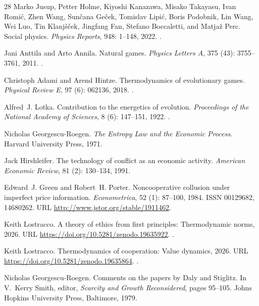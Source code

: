\documentclass[11pt]{article}
\theoremstyle{plain}
\theoremstyle{definition}
\theoremstyle{remark}
\begin{document}
\begin{thebibliography}{28}
Marko Jusup, Petter Holme, Kiyoshi Kanazawa, Misako Takayasu, Ivan Romi{\'c},
  Zhen Wang, Sun{\v c}ana Ge{\v c}ek, Tomislav Lipi{\'c}, Boris Podobnik, Lin
  Wang, Wei Luo, Tin Klanj{\v s}{\v c}ek, Jingfang Fan, Stefano Boccaletti, and
  Matja{\v z} Perc.
\newblock Social physics.
\newblock \emph{Physics Reports}, 948: 1--148, 2022.
\newblock {}.

Jani Anttila and Arto Annila.
\newblock Natural games.
\newblock \emph{Physics Letters A}, 375 (43): 3755--3761,
  2011.
\newblock {}.

Christoph Adami and Arend Hintze.
\newblock Thermodynamics of evolutionary games.
\newblock \emph{Physical Review E}, 97 (6): 062136, 2018.
\newblock {}.

Alfred~J. Lotka.
\newblock Contribution to the energetics of evolution.
\newblock \emph{Proceedings of the National Academy of Sciences}, 8
  (6): 147--151, 1922.
\newblock {}.

Nicholas Georgescu-Roegen.
\newblock \emph{The Entropy Law and the Economic Process}.
\newblock Harvard University Press, 1971.

Jack Hirshleifer.
\newblock The technology of conflict as an economic activity.
\newblock \emph{American Economic Review}, 81 (2): 130--134,
  1991.

Edward~J. Green and Robert~H. Porter.
\newblock Noncooperative collusion under imperfect price information.
\newblock \emph{Econometrica}, 52 (1): 87--100, 1984.
\newblock ISSN 00129682, 14680262.
\newblock URL \url{http://www.jstor.org/stable/1911462}.

Keith Lostracco.
\newblock A theory of ethics from first principles: Thermodynamic norms,
  2026{}.
\newblock URL \url{https://doi.org/10.5281/zenodo.19635922}.
\newblock {}.

Keith Lostracco.
\newblock Thermodynamics of cooperation: Value dynamics, 2026{}.
\newblock URL \url{https://doi.org/10.5281/zenodo.19635864}.
\newblock {}.

Nicholas Georgescu-Roegen.
\newblock Comments on the papers by {Daly} and {Stiglitz}.
\newblock In V.~Kerry Smith, editor, \emph{Scarcity and Growth Reconsidered},
  pages 95--105. Johns Hopkins University Press, Baltimore, 1979.

\end{thebibliography}
\end{document}
